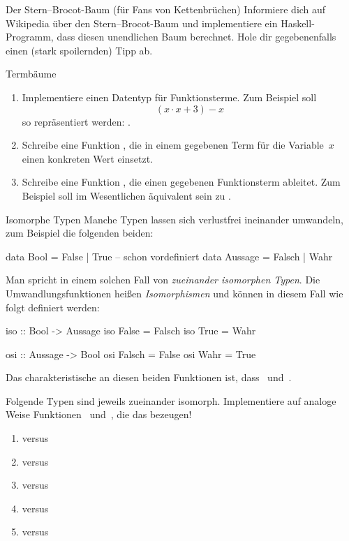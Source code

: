 \documentclass{uebblatt}
\begin{document}
\begin{aufgabe}{Der Stern--Brocot-Baum (für Fans von Kettenbrüchen)}
Informiere dich auf Wikipedia über den Stern--Brocot-Baum und implementiere ein
Haskell-Programm, dass diesen unendlichen Baum berechnet. Hole dir
gegebenenfalls einen (stark spoilernden) Tipp ab.
\end{aufgabe}

\begin{aufgabe}{Termbäume}
\begin{enumerate}
\item Implementiere einen Datentyp für Funktionsterme. Zum Beispiel soll
\[ (x \cdot x + 3) - x \]
so repräsentiert werden: .
\item Schreibe eine Funktion ,
die in einem gegebenen Term für die Variable~$x$ einen konkreten Wert einsetzt.
\item Schreibe eine Funktion , die
einen gegebenen Funktionsterm ableitet. Zum Beispiel soll  im Wesentlichen äquivalent sein zu .
\end{enumerate}
\end{aufgabe}

\begin{aufgabe}{Isomorphe Typen}
Manche Typen lassen sich verlustfrei ineinander umwandeln, zum Beispiel die
folgenden beiden:
\begin{haskellcode}
data Bool    = False  | True  -- schon vordefiniert
data Aussage = Falsch | Wahr
\end{haskellcode}
Man spricht in einem solchen Fall von \emph{zueinander isomorphen Typen}. Die
Umwandlungsfunktionen heißen \emph{Isomorphismen} und können in diesem Fall wie
folgt definiert werden:
\begin{haskellcode}
iso :: Bool -> Aussage
iso False = Falsch
iso True  = Wahr

osi :: Aussage -> Bool
osi Falsch = False
osi Wahr   = True
\end{haskellcode}
Das charakteristische an diesen beiden Funktionen ist, dass~ und~.

Folgende Typen sind jeweils zueinander isomorph. Implementiere
auf analoge Weise Funktionen~ und~, die
das bezeugen!
\begin{enumerate}
\item {}          versus 
\item {}     versus 
\item {} versus 
\item {}     versus 
\item {}     versus 
\end{enumerate}
\end{aufgabe}
\end{document}
